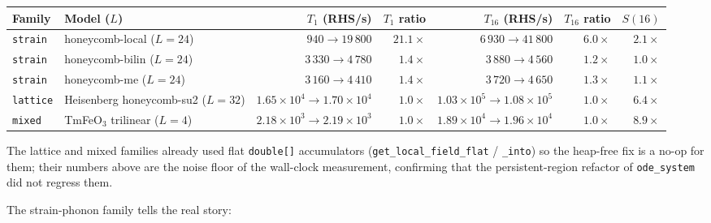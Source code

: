 \documentclass[11pt,letterpaper]{article}
\begin{document}
\begin{center}
\small
\begin{tabular}{llrrrrr}
\hline
Family & Model ($L$) & $T_1$ (RHS/s) & $T_1$ ratio & $T_{16}$ (RHS/s) & $T_{16}$ ratio & $S(16)$ \\
\hline
\texttt{strain} & honeycomb-local ($L=24$) & $940 \to 19\,800$ & $\mathbf{21.1\times}$ & $6\,930 \to 41\,800$ & $\mathbf{6.0\times}$ & $2.1\times$ \\
\texttt{strain} & honeycomb-bilin ($L=24$) & $3\,330 \to 4\,780$ & $1.4\times$           & $3\,880 \to 4\,560$  & $1.2\times$          & $1.0\times$ \\
\texttt{strain} & honeycomb-me    ($L=24$) & $3\,160 \to 4\,410$ & $1.4\times$           & $3\,720 \to 4\,650$  & $1.3\times$          & $1.1\times$ \\
\texttt{lattice} & Heisenberg honeycomb-su2 ($L=32$) & $1.65 \times 10^{4} \to 1.70 \times 10^{4}$ & $1.0\times$ & $1.03 \times 10^{5} \to 1.08 \times 10^{5}$ & $1.0\times$ & $6.4\times$ \\
\texttt{mixed}   & TmFeO$_3$ trilinear ($L=4$)        & $2.18 \times 10^{3} \to 2.19 \times 10^{3}$ & $1.0\times$ & $1.89 \times 10^{4} \to 1.96 \times 10^{4}$ & $1.0\times$ & $8.9\times$ \\
\hline
\end{tabular}
\end{center}

The lattice and mixed families already used flat
\texttt{double[]} accumulators
(\texttt{get\_local\_field\_flat} / \texttt{\_into}) so the heap-free
fix is a no-op for them; their numbers above are the noise floor of
the wall-clock measurement, confirming that the persistent-region
refactor of \texttt{ode\_system} did not regress them.

The strain-phonon family tells the real story:
\end{document}
